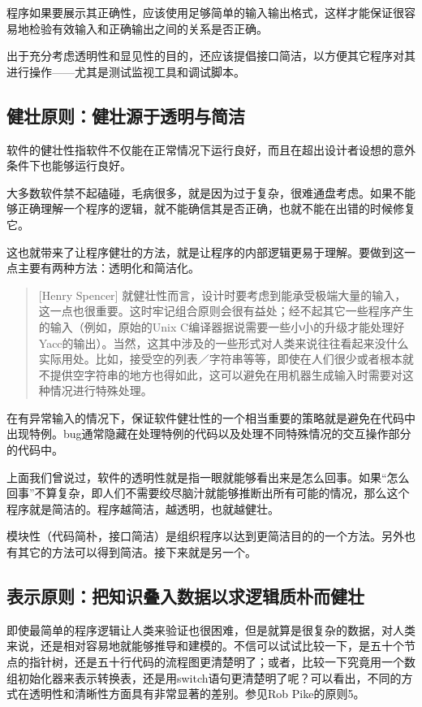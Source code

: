 \documentclass[11pt,oneside]{book}
\begin{document}
\begin{common-format}
程序如果要展示其正确性，应该使用足够简单的输入输出格式，这样才能保证很容易地检验有效输入和正确输出之间的关系是否正确。

出于充分考虑透明性和显见性的目的，还应该提倡接口简洁，以方便其它程序对其进行操作——尤其是测试监视工具和调试脚本。


\subsection{健壮原则：健壮源于透明与简洁}
软件的健壮性指软件不仅能在正常情况下运行良好，而且在超出设计者设想的意外条件下也能够运行良好。

大多数软件禁不起磕碰，毛病很多，就是因为过于复杂，很难通盘考虑。如果不能够正确理解一个程序的逻辑，就不能确信其是否正确，也就不能在出错的时候修复它。

这也就带来了让程序健壮的方法，就是让程序的内部逻辑更易于理解。要做到这一点主要有两种方法：透明化和简洁化。
\begin{quote}[Henry Spencer]
就健壮性而言，设计时要考虑到能承受极端大量的输入，这一点也很重要。这时牢记组合原则会很有益处；经不起其它一些程序产生的输入（例如，原始的Unix C编译器据说需要一些小小的升级才能处理好Yacc的输出）。当然，这其中涉及的一些形式对人类来说往往看起来没什么实际用处。比如，接受空的列表／字符串等等，即使在人们很少或者根本就不提供空字符串的地方也得如此，这可以避免在用机器生成输入时需要对这种情况进行特殊处理。
\end{quote}
    
在有异常输入的情况下，保证软件健壮性的一个相当重要的策略就是避免在代码中出现特例。bug通常隐藏在处理特例的代码以及处理不同特殊情况的交互操作部分的代码中。

上面我们曾说过，软件的透明性就是指一眼就能够看出来是怎么回事。如果“怎么回事”不算复杂，即人们不需要绞尽脑汁就能够推断出所有可能的情况，那么这个程序就是简洁的。程序越简洁，越透明，也就越健壮。

模块性（代码简朴，接口简洁）是组织程序以达到更简洁目的的一个方法。另外也有其它的方法可以得到简洁。接下来就是另一个。

\subsection{表示原则：把知识叠入数据以求逻辑质朴而健壮}
即使最简单的程序逻辑让人类来验证也很困难，但是就算是很复杂的数据，对人类来说，还是相对容易地就能够推导和建模的。不信可以试试比较一下，是五十个节点的指针树，还是五十行代码的流程图更清楚明了；或者，比较一下究竟用一个数组初始化器来表示转换表，还是用switch语句更清楚明了呢？可以看出，不同的方式在透明性和清晰性方面具有非常显著的差别。参见Rob Pike的原则5。


\end{common-format}
\end{document}
